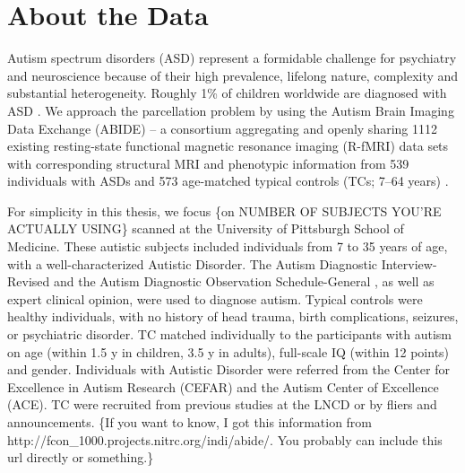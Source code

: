 \section{About the Data}
{\color{blue}Autism spectrum disorders (ASD) represent a formidable challenge
for psychiatry and neuroscience because of their high prevalence, lifelong
nature, complexity and substantial heterogeneity. 
Roughly 1\% of children worldwide are diagnosed
with ASD \citep{centers2010autism}. 
We approach the parcellation problem by using
the Autism Brain Imaging Data Exchange (ABIDE) -- a consortium
aggregating and openly sharing 1112 existing resting-state functional magnetic
resonance imaging (R-fMRI) data sets with corresponding structural MRI and
phenotypic information from 539 individuals with ASDs and 573 age-matched
typical controls (TCs; 7–64 years) .

For simplicity in this thesis, we focus \{on NUMBER OF SUBJECTS YOU'RE ACTUALLY
USING\} scanned at the University of Pittsburgh School of Medicine.
These autistic subjects included individuals from 7 to 35 years of age, with a
well-characterized Autistic Disorder. The Autism Diagnostic Interview-Revised
\citep{lord1994autism} and the Autism Diagnostic Observation Schedule-General
\citep{lord2000autism}, as well as expert clinical opinion, were used to
diagnose autism. Typical controls were healthy individuals, with no history of
head trauma, birth complications, seizures, or psychiatric disorder. TC matched
individually to the participants with autism on age (within 1.5 y in children,
3.5 y in adults), full-scale IQ (within 12 points) and gender. Individuals with
Autistic Disorder were referred from the Center for Excellence in Autism
Research (CEFAR) and the Autism Center of Excellence (ACE). TC were recruited
from previous studies at the LNCD or by fliers and announcements. 
\{If you want to know, I got this information from
http://fcon_1000.projects.nitrc.org/indi/abide/. You probably can include this
url
directly or something.\}

}

